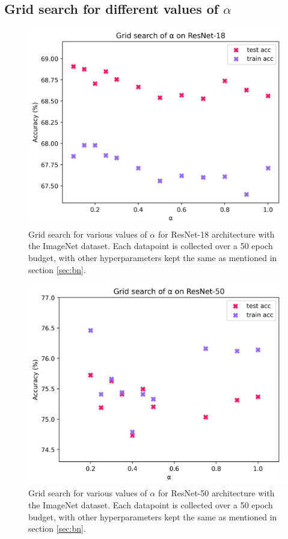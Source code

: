 \documentclass[times,sort&compress]{elsarticle}
\begin{document}
\clearpage


\subsection{Grid search for different values of $\alpha$}


\begin{figure}[ht]
\centering
\includegraphics[width=0.5\columnwidth]{r18_grid_search}
\caption{ Grid search for various values of $\alpha$ for ResNet-18 architecture with the
ImageNet dataset. Each datapoint is collected over a 50 epoch budget, with other
hyperparameters kept the same as mentioned in section \ref{sec:bn}. }
\label{fig:grid_searcha}
\end{figure}


\begin{figure}[ht]
\centering
\includegraphics[width=0.5\columnwidth]{r50_grid_search}
\caption{ Grid search for various values of $\alpha$ for ResNet-50 architecture with the
ImageNet dataset. Each datapoint is collected over a 50 epoch budget, with other
hyperparameters kept the same as mentioned in section \ref{sec:bn}. }
\label{fig:grid_searchb}
\end{figure}


\clearpage
\end{document}
